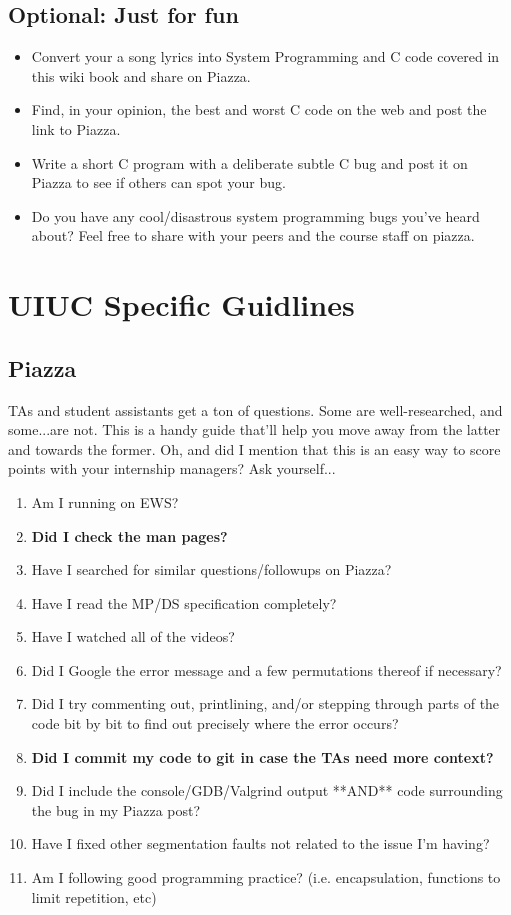 \subsection{Optional: Just for fun}

\begin{itemize}
\item Convert your a song lyrics into System Programming and C code covered in this wiki book and share on Piazza.
\item Find, in your opinion, the best and worst C code on the web and post the link to Piazza.
\item Write a short C program with a deliberate subtle C bug and post it on Piazza to see if others can spot your bug.
\item Do you have any cool/disastrous system programming bugs you've heard about? Feel free to share with your peers and the course staff on piazza.
\end{itemize}

\section{UIUC Specific Guidlines}

\subsection{Piazza}

TAs and student assistants get a ton of questions.
Some are well-researched, and some...are not.
This is a handy guide that'll help you move away from the latter and towards the former.
Oh, and did I mention that this is an easy way to score points with your internship managers? Ask yourself...

\begin{enumerate}
\item Am I running on EWS?
\item \textbf{Did I check the man pages?}
\item Have I searched for similar questions/followups on Piazza?
\item Have I read the MP/DS specification completely?
\item Have I watched all of the videos?
\item Did I Google the error message and a few permutations thereof if necessary?
\item Did I try commenting out, printlining, and/or stepping through parts of the code bit by bit to find out precisely where the error occurs?
\item \textbf{Did I commit my code to git in case the TAs need more context?}
\item Did I include the console/GDB/Valgrind output **AND** code surrounding the bug in my Piazza post?
\item Have I fixed other segmentation faults not related to the issue I'm having?
\item Am I following good programming practice? (i.e. encapsulation, functions to limit repetition, etc)
\end{enumerate}
